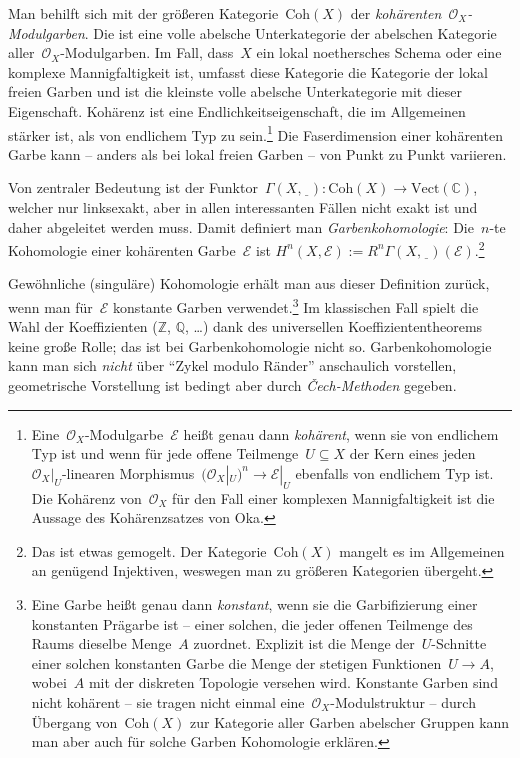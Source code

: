 \documentclass[a4paper,ngerman,12pt]{scrartcl}
\theoremstyle{definition}
\theoremstyle{plain}
\theoremstyle{remark}
\newcommand{\CC}{\mathbb{C}}
\newcommand{\ZZ}{\mathbb{Z}}
\newcommand{\QQ}{\mathbb{Q}}
\newcommand{\E}{\mathcal{E}}
\renewcommand{\O}{\mathcal{O}}
\newcommand{\Vect}{\mathrm{Vect}}
\newcommand{\Coh}{\mathrm{Coh}}
\newcommand{\placeholder}{\underline{\ \ }}
\begin{document}
Man behilft sich mit der größeren Kategorie~$\Coh(X)$ der
\emph{kohärenten~$\O_X$-Modulgarben}. Die ist eine volle abelsche Unterkategorie der
abelschen Kategorie aller~$\O_X$-Modulgarben. Im Fall, dass~$X$ ein
lokal noethersches Schema oder eine komplexe Mannigfaltigkeit ist, umfasst
diese Kategorie die Kategorie der lokal freien Garben und ist die kleinste
volle abelsche Unterkategorie mit dieser Eigenschaft. Kohärenz ist eine
Endlichkeitseigenschaft, die im Allgemeinen stärker ist, als von endlichem Typ
zu sein.\footnote{Eine~$\O_X$-Modulgarbe~$\E$ heißt genau dann \emph{kohärent},
wenn sie von endlichem Typ ist und wenn für jede offene Teilmenge~$U \subseteq
X$ der Kern eines jeden~$\O_X|_U$-linearen Morphismus~$(\O_X|_U)^n \to \E|_U$
ebenfalls von endlichem Typ ist. Die Kohärenz von~$\O_X$ für den Fall einer
komplexen Mannigfaltigkeit ist die Aussage des Kohärenzsatzes von Oka.} Die
Faserdimension einer kohärenten Garbe kann -- anders als bei lokal freien
Garben -- von Punkt zu Punkt variieren.

Von zentraler Bedeutung ist der Funktor~$\Gamma(X,\placeholder) : \Coh(X) \to
\Vect(\CC)$, welcher nur linksexakt, aber in allen interessanten Fällen nicht
exakt ist und daher abgeleitet werden muss. Damit definiert man
\emph{Garbenkohomologie}: Die~$n$-te Kohomologie einer kohärenten Garbe~$\E$
ist $H^n(X, \E) := R^n \Gamma(X,\placeholder)(\E)$.\footnote{Das ist etwas
gemogelt. Der Kategorie~$\Coh(X)$ mangelt es im Allgemeinen an genügend
Injektiven, weswegen man zu größeren Kategorien übergeht.}

Gewöhnliche (singuläre) Kohomologie erhält man aus dieser Definition zurück,
wenn man für~$\E$ konstante Garben verwendet.\footnote{Eine Garbe heißt genau
dann \emph{konstant}, wenn sie die Garbifizierung einer konstanten Prägarbe ist
-- einer solchen, die jeder offenen Teilmenge des Raums dieselbe Menge~$A$
zuordnet. Explizit ist die Menge der~$U$-Schnitte einer solchen konstanten Garbe
die Menge der stetigen Funktionen~$U \to A$, wobei~$A$ mit der diskreten
Topologie versehen wird. Konstante Garben sind nicht kohärent -- sie tragen
nicht einmal eine~$\O_X$-Modulstruktur -- durch Übergang von~$\Coh(X)$ zur
Kategorie aller Garben abelscher Gruppen kann man aber auch für solche Garben
Kohomologie erklären.} Im klassischen Fall spielt die Wahl der Koeffizienten
($\ZZ$, $\QQ$, \ldots) dank des universellen Koeffiziententheorems keine große
Rolle; das ist bei Garbenkohomologie nicht so. Garbenkohomologie kann man sich
\emph{nicht} über "`Zykel modulo Ränder"' anschaulich vorstellen, geometrische
Vorstellung ist bedingt aber durch \emph{Čech-Methoden} gegeben.
\end{document}
